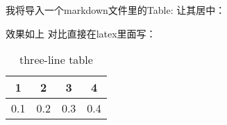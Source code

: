 \documentclass[UTF8]{ctexart}
\begin{document}
我将导入一个markdown文件里的Table:  
让其居中：
\begin{table}[!htbp]
\centering
{}  
\end{table}

效果如上  
对比直接在latex里面写：  
\begin{table}[htbp]
    \centering
    \caption{three-line table}
    \begin{tabular}{cccc}
        \toprule  %
        1&2&3&4 \\ 
        \midrule  %
        0.1&0.2&0.3&0.4 \\
        \bottomrule  %
    \end{tabular}
\end{table}
\end{document}
